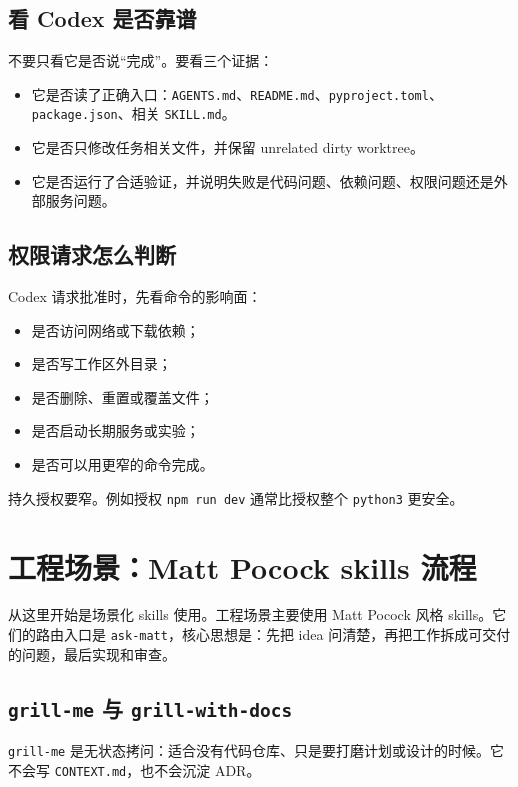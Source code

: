 \documentclass[UTF8,a4paper,11pt,fontset=none]{ctexart}
\newcommand{\skill}[1]{\texttt{#1}}
\newcommand{\file}[1]{\texttt{#1}}
\newcommand{\cmd}[1]{\texttt{#1}}
\begin{document}
\subsection{看 Codex 是否靠谱}

不要只看它是否说“完成”。要看三个证据：

\begin{itemize}
  \item 它是否读了正确入口：\file{AGENTS.md}、\file{README.md}、\file{pyproject.toml}、\file{package.json}、相关 \file{SKILL.md}。
  \item 它是否只修改任务相关文件，并保留 unrelated dirty worktree。
  \item 它是否运行了合适验证，并说明失败是代码问题、依赖问题、权限问题还是外部服务问题。
\end{itemize}

\subsection{权限请求怎么判断}

Codex 请求批准时，先看命令的影响面：

\begin{itemize}
  \item 是否访问网络或下载依赖；
  \item 是否写工作区外目录；
  \item 是否删除、重置或覆盖文件；
  \item 是否启动长期服务或实验；
  \item 是否可以用更窄的命令完成。
\end{itemize}

持久授权要窄。例如授权 \cmd{npm run dev} 通常比授权整个 \cmd{python3} 更安全。

\section{工程场景：Matt Pocock skills 流程}

从这里开始是场景化 skills 使用。工程场景主要使用 Matt Pocock 风格 skills。它们的路由入口是 \skill{ask-matt}，核心思想是：先把 idea 问清楚，再把工作拆成可交付的问题，最后实现和审查。

\subsection{\skill{grill-me} 与 \skill{grill-with-docs}}

\skill{grill-me} 是无状态拷问：适合没有代码仓库、只是要打磨计划或设计的时候。它不会写 \file{CONTEXT.md}，也不会沉淀 ADR。
\end{document}
